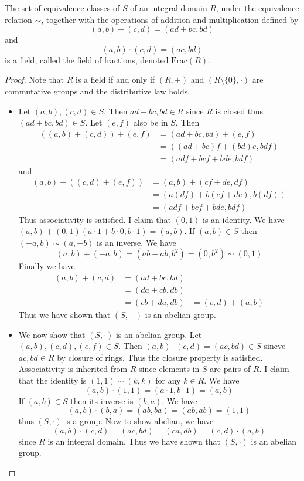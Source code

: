 \documentclass[a4paper]{article}
\begin{document}
\begin{prp}{}{} The set of equivalence classes of $S$ of an integral domain $R$, under the equivalence relation $\sim$, together with the operations of addition and multiplication defined by $$(a,b)+(c,d)=(ad+bc,bd)$$ and $$(a,b)\cdot(c,d)=(ac,bd)$$ is a field, called the field of fractions, denoted $\text{Frac}(R)$. \tcbline
\begin{proof} Note that $R$ is a field if and only if $(R,+)$ and $(R\setminus\{0\},\cdot)$ are commutative groups and the distributive law holds. 
\begin{itemize}
\item Let $(a,b),(c,d)\in S$. Then $ad+bc,bd\in R$ since $R$ is closed thus $(ad+bc,bd)\in S$. Let $(e,f)$ also be in $S$. Then 
\begin{align*}
((a,b)+(c,d))+(e,f)&=(ad+bc,bd)+(e,f)\\
&=((ad+bc)f+(bd)e,bdf)\\
&=(adf+bcf+bde,bdf)
\end{align*}
and 
\begin{align*}
(a,b)+((c,d)+(e,f))&=(a,b)+(cf+de,df)\\
&=(a(df)+b(cf+de),b(df))\\
&=(adf+bcf+bde,bdf)
\end{align*}
Thus associativity is satisfied. I claim that $(0,1)$ is an identity. We have $(a,b)+(0,1)(a\cdot 1+b\cdot 0,b\cdot 1)=(a,b)$. If $(a,b)\in S$ then $(-a,b)\sim(a,-b)$ is an inverse. We have $$(a,b)+(-a,b)=(ab-ab,b^2)=(0,b^2)\sim(0,1)$$ Finally we have 
\begin{align*}
(a,b)+(c,d)&=(ad+bc,bd)\\
&=(da+cb,db)\tag{$R$ is an Integral Domain}\\
&=(cb+da,db)\tag{$R$ is an abelian group}
&=(c,d)+(a,b)
\end{align*}
Thus we have shown that $(S,+)$ is an abelian group. 
\item We now show that $(S,\cdot)$ is an abelian group. Let $(a,b),(c,d),(e,f)\in S$. Then $(a,b)\cdot(c,d)=(ac,bd)\in S$ sincve $ac,bd\in R$ by closure of rings. Thus the closure property is satisfied. Associativity is inherited from $R$ since elements in $S$ are pairs of $R$. I claim that the identity is $(1,1)\sim(k,k)$ for any $k\in R$. We have $$(a,b)\cdot(1,1)=(a\cdot1,b\cdot 1)=(a,b)$$ If $(a,b)\in S$ then its inverse is $(b,a)$. We have $$(a,b)\cdot(b,a)=(ab,ba)=(ab,ab)=(1,1)$$ thus $(S,\cdot)$ is a group. Now to show abelian, we have $$(a,b)\cdot(c,d)=(ac,bd)=(ca,db)=(c,d)\cdot(a,b)$$ since $R$ is an integral domain. Thus we have shown that $(S,\cdot)$ is an abelian group. 

\end{itemize}
\end{proof}
\end{prp}
\end{document}
